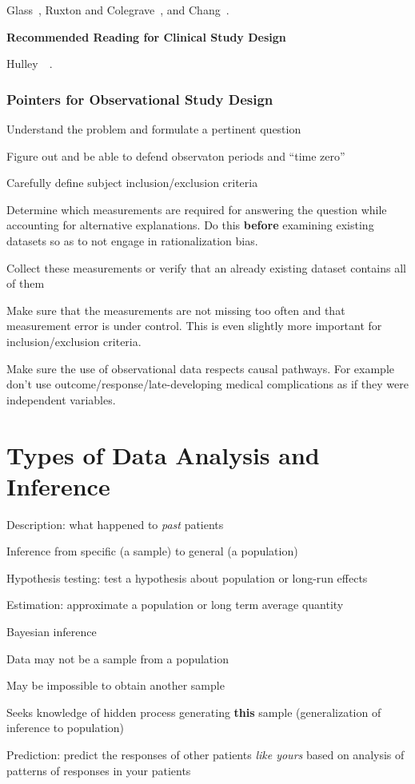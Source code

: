 Glass~\cite{gla14exp}, Ruxton and Colegrave~\cite{rux17exp}, and
Chang~\cite{cha16pri}.

\textbf{Recommended Reading for Clinical Study Design}

Hulley~\etal~\cite{hul13des}.

\subsubsection{Pointers for Observational Study Design}   %
\bi
\item Understand the problem and formulate a pertinent question
\item Figure out and be able to defend observaton periods and ``time zero''
\item Carefully define subject inclusion/exclusion criteria
\item Determine which measurements are required for answering the
  question while accounting for alternative explanations.  Do this
  \textbf{before} examining existing datasets so as to not engage in
  rationalization bias.
\item Collect these measurements or verify that an already existing
  dataset contains all of them
\item Make sure that the measurements are not missing too often and
  that measurement error is under control.  This is even slightly more
  important for inclusion/exclusion criteria.
\item Make sure the use of observational data respects causal
  pathways.  For example don't use outcome/response/late-developing
  medical complications as if they were independent variables.
\ei
  
\section{Types of Data Analysis and Inference}\label{sec:overview-datatypes}
 \bi
 \item Description: what happened to \emph{past} patients
 \item Inference from specific (a sample) to general (a population)
 \bi
  \item Hypothesis testing: test a hypothesis about population or
   long-run effects
  \item Estimation: approximate a population or long term average
    quantity
    \ei
  \item Bayesian inference
    \bi
    \item Data may not be a sample from a population
    \item May be impossible to obtain another sample
    \item Seeks knowledge of hidden process generating \textbf{this}
      sample (generalization of inference to population)
    \ei
 \item Prediction: predict the responses of other patients \emph{like yours}
   based on analysis of patterns of responses in your patients
   \ei

